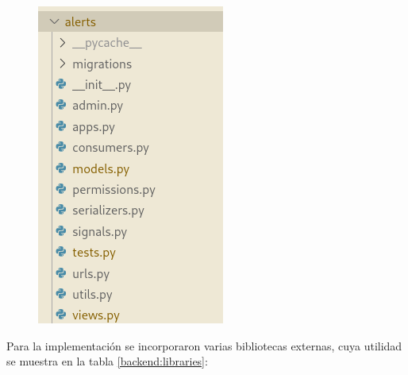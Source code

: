 \begin{figure}[H]
\begin{minipage}{.5\textwidth}
  \includegraphics[width=.75\linewidth]{./Figures/backend-folder2.png}
  \label{backend:folder2}
\end{minipage}
\end{figure}

Para la implementación se incorporaron varias bibliotecas externas, cuya utilidad se muestra en la tabla \ref{backend:libraries}:

